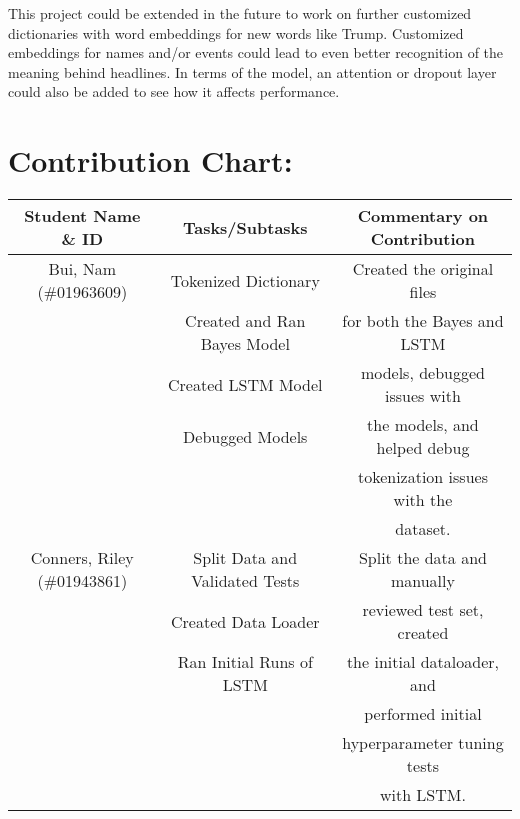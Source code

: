 \documentclass[11pt]{article}
\begin{document}
This project could be extended in the future to work on further customized dictionaries with word embeddings for new words like Trump. Customized embeddings for names and/or events could lead to even better recognition of the meaning behind headlines. In terms of the model, an attention or dropout layer could also be added to see how it affects performance.

\section{Contribution Chart:}

\begin{table}[H]
    \centering
    \begin{tabular}{c|c|c}
        \hline
        Student Name \& ID          & Tasks/Subtasks                 & Commentary on Contribution \\
        \hline
        Bui, Nam (\#01963609)       & Tokenized Dictionary           & Created the original files \\
                                    & Created and Ran Bayes Model    & for both the Bayes and LSTM\\
                                    & Created LSTM Model             &models, debugged issues with\\
                                    & Debugged Models                &the models, and helped debug\\ 
                                    &                                &tokenization issues with the\\ 
                                    &                                & dataset.                   \\
        \hline
        Conners, Riley (\#01943861) & Split Data and Validated Tests &Split the data and manually \\
                                    & Created Data Loader            &reviewed test set, created  \\
                                    & Ran Initial Runs of LSTM       &the initial dataloader, and \\
                                    &                                &performed initial           \\
                                    &                                &hyperparameter tuning tests \\
                                    &                                & with LSTM.                 \\

\end{tabular}
\end{table}
\end{document}
